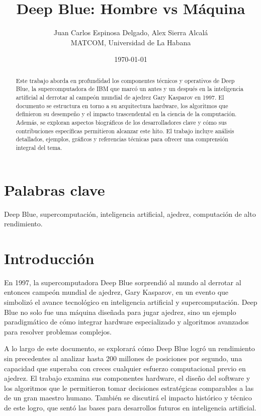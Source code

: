 \documentclass[12pt,a4paper]{article}
\title{Deep Blue: Hombre vs Máquina}
\author{Juan Carlos Espinosa Delgado, Alex Sierra Alcalá \\ MATCOM, Universidad de La Habana}
\date{\today}
\begin{document}
\maketitle

\begin{abstract}
Este trabajo aborda en profundidad los componentes técnicos y operativos de Deep Blue, la supercomputadora de IBM que marcó un antes y un después en la inteligencia artificial al derrotar al campeón mundial de ajedrez Gary Kasparov en 1997. El documento se estructura en torno a su arquitectura hardware, los algoritmos que definieron su desempeño y el impacto trascendental en la ciencia de la computación. Además, se exploran aspectos biográficos de los desarrolladores clave y cómo sus contribuciones específicas permitieron alcanzar este hito. El trabajo incluye análisis detallados, ejemplos, gráficos y referencias técnicas para ofrecer una comprensión integral del tema.
\end{abstract}

\section*{Palabras clave}
Deep Blue, supercomputación, inteligencia artificial, ajedrez, computación de alto rendimiento.

\section{Introducción}
En 1997, la supercomputadora Deep Blue sorprendió al mundo al derrotar al entonces campeón mundial de ajedrez, Gary Kasparov, en un evento que simbolizó el avance tecnológico en inteligencia artificial y supercomputación. Deep Blue no solo fue una máquina diseñada para jugar ajedrez, sino un ejemplo paradigmático de cómo integrar hardware especializado y algoritmos avanzados para resolver problemas complejos. 

A lo largo de este documento, se explorará cómo Deep Blue logró un rendimiento sin precedentes al analizar hasta 200 millones de posiciones por segundo, una capacidad que superaba con creces cualquier esfuerzo computacional previo en ajedrez. El trabajo examina sus componentes hardware, el diseño del software y los algoritmos que le permitieron tomar decisiones estratégicas comparables a las de un gran maestro humano. También se discutirá el impacto histórico y técnico de este logro, que sentó las bases para desarrollos futuros en inteligencia artificial.
\end{document}
